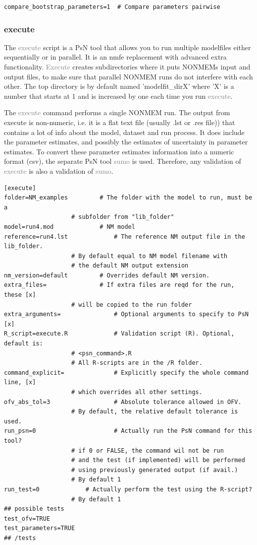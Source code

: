\documentclass[a4,11pt]{report} \usepackage[pdftex]{graphicx}
\newcommand{\psn}[1]{\textcolor{Grey}{#1}}
\begin{document}
\begin{lstlisting}
compare_bootstrap_parameters=1  # Compare parameters pairwise
\end{lstlisting}

\subsubsection{execute}
The \psn{execute} script is a PsN tool that allows you to run multiple
modelfiles either sequentially or in parallel. It is an nmfe
replacement with advanced extra functionality. \psn{Execute} creates
subdirectories where it puts NONMEMs input and output files, to make
sure that parallel NONMEM runs do not interfere with each other. The
top directory is by default named 'modelfit\_dirX' where 'X' is a
number that starts at 1 and is increased by one each time you run
\psn{execute}.

\vspace{10pt}

\noindent The \psn{execute} command performs a single NONMEM run. The output
from execute is non-numeric, i.e. it is a flat text file (usually .lst
or .res file)) that contains a lot of info about the model, dataset
and run process. It does include the parameter estimates, and possibly
the estimates of uncertainty in parameter estimates. To convert these
parameter estimates information into a numeric format (csv), the
separate PsN tool \psn{sumo} is used. Therefore, any validation of
\psn{execute} is also a validation of \psn{sumo}.

\begin{lstlisting}
[execute]
folder=NM_examples	       # The folder with the model to run, must be a
			       # subfolder from "lib_folder"
model=run4.mod		       # NM model
reference=run4.lst             # The reference NM output file in the lib_folder.
			       # By default equal to NM model filename with
			       # the default NM output extension
nm_version=default	       # Overrides default NM version.
extra_files=		       # If extra files are reqd for the run, these [x]
			       # will be copied to the run folder
extra_arguments=               # Optional arguments to specify to PsN [x]
R_script=execute.R  	       # Validation script (R). Optional, default is:
			       # <psn_command>.R
			       # All R-scripts are in the /R folder.
command_explicit=              # Explicitly specify the whole command line, [x]
			       # which overrides all other settings.
ofv_abs_tol=3                  # Absolute tolerance allowed in OFV.
			       # By default, the relative default tolerance is used.
run_psn=0                      # Actually run the PsN command for this tool?
			       # if 0 or FALSE, the command wil not be run
			       # and the test (if implemented) will be performed
			       # using previously generated output (if avail.)
			       # By default 1
run_test=0		       # Actually perform the test using the R-script?
			       # By default 1
## possible tests
test_ofv=TRUE
test_parameters=TRUE
## /tests
\end{lstlisting}
\end{document}
